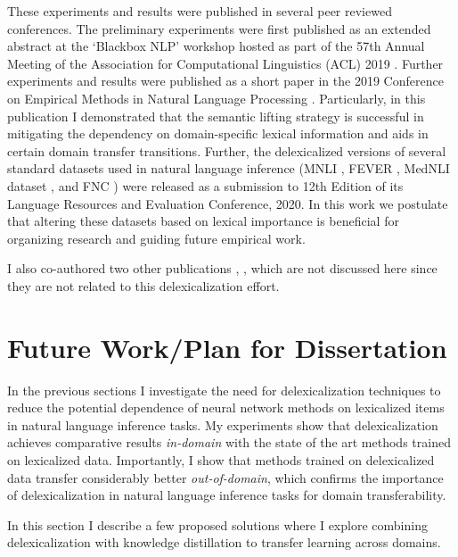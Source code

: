 \documentclass{article}
\begin{document}
These experiments and results were published in several peer reviewed conferences. The preliminary experiments were first published as an extended abstract at the `Blackbox NLP' workshop hosted as part of the 57th Annual Meeting of the Association for Computational Linguistics (ACL) 2019  \cite{suntwal2019importance}. Further experiments and results were published as a short paper in the 2019 Conference on Empirical Methods in Natural Language Processing \cite{emnlp2019sandeep}. Particularly, in this publication I demonstrated that the semantic lifting strategy is successful in mitigating the dependency on domain-specific lexical information and aids in certain domain transfer transitions. Further, the delexicalized versions of several standard datasets used in natural language inference (MNLI \citep*{williams2017broad}, FEVER \citep*{thorne2018fever}, MedNLI dataset \cite{romanov2018lessons}, and FNC \citep*{pomerleau2017fake}) were released as a submission to 12th Edition of its Language Resources and Evaluation Conference, 2020. In this work we postulate that altering these datasets based on lexical importance is beneficial for organizing research and guiding future empirical work. 

I also co-authored two other publications \cite{sharp}, \cite{sharpGrounding}, which are not discussed here since they are not related to this delexicalization effort.


 
\section{Future Work/Plan for Dissertation}
In the previous sections I investigate the need for delexicalization techniques to reduce the potential dependence of neural network methods on lexicalized items in natural language inference tasks. My experiments show that delexicalization achieves comparative results {\em in-domain} with the state of the art methods trained on lexicalized data. Importantly, I show that methods trained on delexicalized data transfer considerably better {\em out-of-domain}, which  confirms the importance of delexicalization in natural language inference tasks for domain transferability.

In this section I describe a few proposed solutions where I explore combining delexicalization with knowledge distillation to transfer learning across domains.
\end{document}
